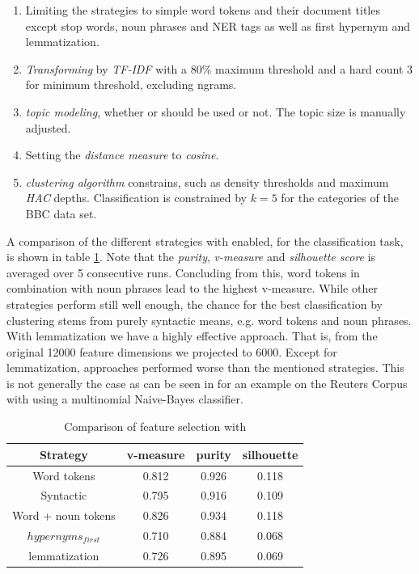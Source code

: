   \begin{enumerate}
    \item Limiting the strategies to simple word tokens and their document titles except stop words, noun phrases and NER tags as well as \wordnet{} first hypernym and \wordnet{}lemmatization.

    \item \emph{Transforming} by \emph{TF-IDF} with a 80\% maximum threshold and a hard count $3$ for minimum threshold, excluding ngrams.

    \item \emph{topic modeling}, whether \lsa{} or \lda{} should be used or not. The topic size is manually adjusted.

    \item Setting the \emph{distance measure} to \emph{cosine}.

    \item \emph{clustering algorithm} constrains, such as density thresholds and maximum \emph{HAC} depths. Classification is constrained by $k=5$ for the categories of the BBC data set.
  \end{enumerate}

A comparison of the different strategies with \lsa{} enabled, for the classification task, is shown in table \ref{comparison_single_with_lsa}. Note that the \emph{purity}, \emph{v-measure} and \emph{silhouette score} is averaged over 5 consecutive runs. Concluding from this, word tokens in combination with noun phrases lead to the highest v-measure. While other strategies perform still well enough, the chance for the best classification by clustering stems from purely syntactic means, e.g. word tokens and noun phrases. With \wordnet{} lemmatization we have a highly effective approach. That is, from the original 12000 feature dimensions we projected to 6000. Except for lemmatization, \wordnet{} approaches performed worse than the mentioned strategies. This is not generally the case as can be seen in \cite{TopicClassificationReuters2002} for an example on the Reuters Corpus with \wordnet{} using a multinomial Naive-Bayes classifier.

  \begin{table}[h!]\label{comparison_single_with_lsa}
    \begin{tabular}{ c | c | c | c }
      Strategy    & v-measure & purity  & silhouette \\ \hline
      Word tokens & 0.812     & 0.926   & 0.118      \\
      Syntactic   & 0.795     & 0.916     & 0.109 \\
      Word + noun tokens & 0.826   & 0.934     & 0.118 \\
      \wordnet{} $hypernyms_{first}$ & 0.710   & 0.884     & 0.068 \\
      \wordnet{} lemmatization   & 0.726   & 0.895     & 0.069 \\
    \end{tabular}
    \caption{Comparison of feature selection with \lsa{}}
  \end{table}

